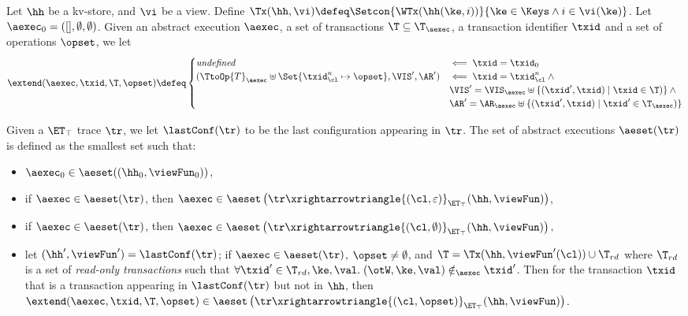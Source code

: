 \begin{definition}
\label{def:kvtrace2aexec}
Let $\hh$ be a kv-store, and $\vi$ be a view. 
Define $\Tx(\hh, \vi) \defeq \Setcon{ \WTx(\hh(\ke, i)) }{ \ke \in \Keys \wedge i \in \vi(\ke) }$. 
Let $\aexec_0 = ( [ ], \emptyset, \emptyset)$. Given an abstract execution $\aexec$, a set of transactions  
$\T \subseteq \T_{\aexec}$, a transaction identifier $\txid$ and a set of operations $\opset$, we let 
\[
\extend(\aexec, \txid, \T, \opset) \defeq
\begin{cases}
\textit{undefined} &\impliedby \txid = \txid_{0}\\
(\TtoOp{T}_{\aexec} \uplus \Set{\txid_{\cl}^{n} \mapsto \opset}, \VIS', \AR') & \impliedby \txid = \txid_{\cl}^{n} \wedge {}\\
& \VIS' = \VIS_{\aexec} \uplus \{(\txid', \txid) \mid \txid \in \T)\} \wedge {}\\
& \AR' = \AR_{\aexec} \uplus \{(\txid', \txid) \mid \txid' \in \T_{\aexec})\}\\
\end{cases}
\]

Given a $\ET_{\top}$ trace $\tr$, we let $\lastConf(\tr)$ to be the last configuration appearing in 
$\tr$. The set of abstract executions $\aeset(\tr)$ is defined as the smallest set such that:
\begin{itemize}
\item $\aexec_{0} \in \aeset((\hh_{0}, \viewFun_{0}))$, 
\item if $\aexec \in \aeset(\tr)$, then $\aexec \in \aeset\left(\tr \xrightarrowtriangle{(\cl, \varepsilon)}_{\ET_{\top}} (\hh, \viewFun) \right)$, 
\item if $\aexec \in \aeset(\tr)$, then $\aexec \in \aeset\left(\tr \xrightarrowtriangle{(\cl, \emptyset)}_{\ET_{\top}} (\hh, \viewFun) \right)$, 
\item let $(\hh', \viewFun') = \lastConf(\tr)$; 
    if $\aexec \in \aeset(\tr)$, $\opset \neq \emptyset$, and $\T = \Tx(\hh, \viewFun'(\cl)) \cup \T_{rd}$ where \( \T_{rd} \) 
    is a set of \emph{read-only transactions} such that $\forall \txid' \in \T_{rd}, \ke, \val.\; (\otW, \ke, \val) \notin_{\aexec} \txid'$.
    Then for the transaction $\txid$ that is a transaction appearing in $\lastConf(\tr)$ but not in $\hh$, then  
$\extend(\aexec, \txid, \T, \opset) \in \aeset\left(\tr \xrightarrowtriangle{(\cl, \opset)}_{\ET_{\top}} (\hh, \viewFun) \right)$.
\end{itemize}
\end{definition}

